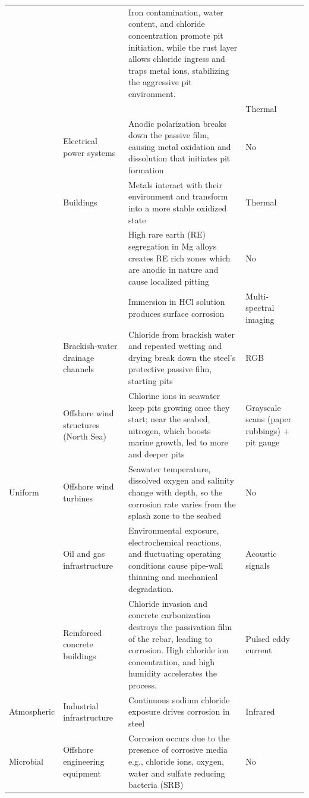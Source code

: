 {\begin{xltabular}{\textwidth}{>{\RaggedRight\arraybackslash}p{1.5cm}>{\RaggedRight\arraybackslash}p{2.6cm}>{\RaggedRight\arraybackslash}X>{\RaggedRight\arraybackslash}p{2.4cm}>{\RaggedRight\arraybackslash}p{1.9cm}}
 &  & Iron contamination, water content, and chloride concentration promote pit initiation, while the rust layer allows chloride ingress and traps metal ions, stabilizing the aggressive pit environment. &  &  \\
 &  &  & Thermal & \citep{Liu2021} \\
 & Electrical power systems & Anodic polarization breaks down the passive film, causing metal oxidation and dissolution that initiates pit formation & No & \citep{Wojciechowski2025} \\
 & Buildings & Metals interact with their environment and transform into a more stable oxidized state & Thermal & \citep{Elizalde2023} \\
 &  & High rare earth (RE) segregation in Mg alloys creates RE rich zones which are anodic in nature and cause localized pitting & No & \citep{Qin2026} \\
 &  & Immersion in HCl solution produces surface corrosion & Multi-spectral imaging & \citep{Egodawela2025} \\
 & Brackish-water drainage channels & Chloride from brackish water and repeated wetting and drying break down the steel's protective passive film, starting pits & RGB & \citep{Suzuki2026} \\
 & Offshore wind structures (North Sea) & Chlorine ions in seawater keep pits growing once they start; near the seabed, nitrogen, which boosts marine growth, led to more and deeper pits & Grayscale scans (paper rubbings) + pit gauge & \citep{Khodabux2021a} \\
\midrule
Uniform & Offshore wind turbines & Seawater temperature, dissolved oxygen and salinity change with depth, so the corrosion rate varies from the splash zone to the seabed & No & \citep{Khodabux2020} \\
 & Oil and gas infrastructure & Environmental exposure, electrochemical reactions, and fluctuating operating conditions cause pipe-wall thinning and mechanical degradation. & Acoustic signals & \citep{Yang2026a} \\
 & Reinforced concrete buildings & Chloride invasion and concrete carbonization destroys the passivation film of the rebar, leading to corrosion. High chloride ion concentration, and high humidity accelerates the process. & Pulsed eddy current & \citep{Yang2025} \\
\midrule
Atmospheric & Industrial infrastructure & Continuous sodium chloride exposure drives corrosion in steel & Infrared & \citep{DeKerf2022} \\
\midrule
Microbial & Offshore engineering equipment & Corrosion occurs due to the presence of corrosive media e.g., chloride ions, oxygen, water and sulfate reducing bacteria (SRB) & No & \citep{Liang2021} \\
\end{xltabular}
}

